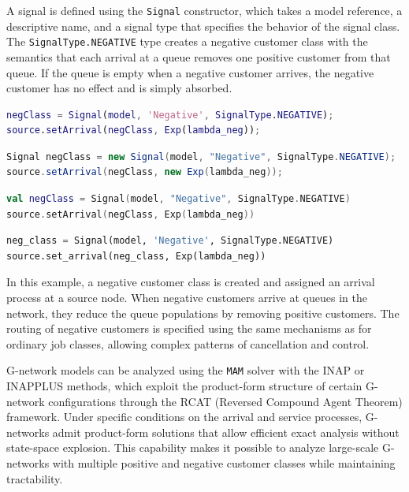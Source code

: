 A signal is defined using the \texttt{Signal} constructor, which takes a model reference, a descriptive name, and a signal type that specifies the behavior of the signal class. The \texttt{SignalType.NEGATIVE} type creates a negative customer class with the semantics that each arrival at a queue removes one positive customer from that queue. If the queue is empty when a negative customer arrives, the negative customer has no effect and is simply absorbed.

\begin{MATLAB}
\begin{lstlisting}[language = matlab]
negClass = Signal(model, 'Negative', SignalType.NEGATIVE);
source.setArrival(negClass, Exp(lambda_neg));
\end{lstlisting}
\end{MATLAB}
\begin{JAVA}
\begin{lstlisting}[language=java, basicstyle=\ttfamily\scriptsize]
Signal negClass = new Signal(model, "Negative", SignalType.NEGATIVE);
source.setArrival(negClass, new Exp(lambda_neg));
\end{lstlisting}
\end{JAVA}
\begin{KOTLIN}
\begin{lstlisting}[language=kotlin, basicstyle=\ttfamily\scriptsize]
val negClass = Signal(model, "Negative", SignalType.NEGATIVE)
source.setArrival(negClass, Exp(lambda_neg))
\end{lstlisting}
\end{KOTLIN}
\begin{PYTHON}
\begin{lstlisting}[language=python]
neg_class = Signal(model, 'Negative', SignalType.NEGATIVE)
source.set_arrival(neg_class, Exp(lambda_neg))
\end{lstlisting}
\end{PYTHON}

In this example, a negative customer class is created and assigned an arrival process at a source node. When negative customers arrive at queues in the network, they reduce the queue populations by removing positive customers. The routing of negative customers is specified using the same mechanisms as for ordinary job classes, allowing complex patterns of cancellation and control.

G-network models can be analyzed using the \texttt{MAM} solver with the INAP or INAPPLUS methods, which exploit the product-form structure of certain G-network configurations through the RCAT (Reversed Compound Agent Theorem) framework. Under specific conditions on the arrival and service processes, G-networks admit product-form solutions that allow efficient exact analysis without state-space explosion. This capability makes it possible to analyze large-scale G-networks with multiple positive and negative customer classes while maintaining tractability.

